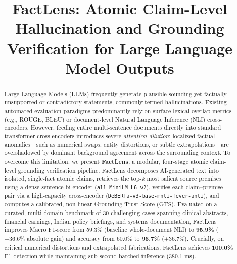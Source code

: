 \documentclass[conference]{IEEEtran}
\begin{document}
\title{FactLens: Atomic Claim-Level Hallucination and Grounding Verification for Large Language Model Outputs}

\author{
}

\maketitle

\begin{abstract}
Large Language Models (LLMs) frequently generate plausible-sounding yet factually unsupported or contradictory statements, commonly termed hallucinations. Existing automated evaluation paradigms predominantly rely on surface lexical overlap metrics (e.g., ROUGE, BLEU) or document-level Natural Language Inference (NLI) cross-encoders. However, feeding entire multi-sentence documents directly into standard transformer cross-encoders introduces severe \textit{attention dilution}: localized factual anomalies—such as numerical swaps, entity distortions, or subtle extrapolations—are overshadowed by dominant background agreement across the surrounding context. To overcome this limitation, we present \textbf{FactLens}, a modular, four-stage atomic claim-level grounding verification pipeline. FactLens decomposes AI-generated text into isolated, single-fact atomic claims, retrieves the top-$k$ most salient source premises using a dense sentence bi-encoder (\texttt{all-MiniLM-L6-v2}), verifies each claim–premise pair via a high-capacity cross-encoder (\texttt{DeBERTa-v3-base-mnli-fever-anli}), and computes a calibrated, non-linear Grounding Trust Score ($\text{GTS}$). Evaluated on a curated, multi-domain benchmark of 30 challenging cases spanning clinical abstracts, financial earnings, Indian policy briefings, and systems documentation, FactLens improves Macro F1-score from 59.3\% (baseline whole-document NLI) to \textbf{95.9\%} ($+36.6\%$ absolute gain) and accuracy from 60.0\% to \textbf{96.7\%} ($+36.7\%$). Crucially, on critical numerical distortions and extrapolated fabrications, FactLens achieves \textbf{100.0\%} F1 detection while maintaining sub-second batched inference ($380.1\text{ ms}$).
\end{abstract}
\end{document}
